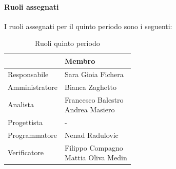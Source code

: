 \documentclass[a4paper,12pt]{article}
\begin{document}
            \paragraph{Ruoli assegnati}
            I ruoli assegnati per il quinto periodo sono i seguenti:
                \begin{table}[H]
                \centering
                \begin{tabular}{|l|l|}
                \hline
                    \rowcolor{lightgray}{\textbf{Ruolo}} & {\textbf{Membro}} \\
                \hline
                    Responsabile & Sara Gioia Fichera \\
                \hline
                    Amministratore & Bianca Zaghetto \\
                \hline
                    Analista & \makecell[l]{Francesco Balestro \\ Andrea Masiero} \\
                \hline
                    Progettista & - \\
                \hline
                    Programmatore & Nenad Radulovic \\
                \hline
                    Verificatore & \makecell[l]{Filippo Compagno \\ Mattia Oliva Medin} \\
                \hline
                \end{tabular}
                \caption{Ruoli quinto periodo}
                \end{table}
                
\end{document}
